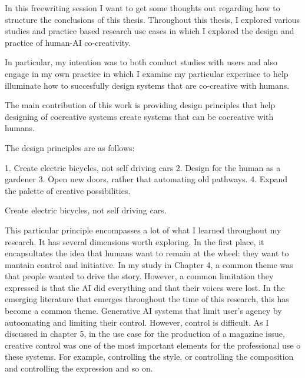 In this freewriting session I want to get some thoughts out regarding how to structure the conclusions of this thesis. Throughout this thesis, I explored various studies and practice based research use cases in which I explored the design and practice of human-AI co-creativity. 

In particular, my intention was to both conduct studies with users and also engage in my own practice in which I examine my particular experince to help illuminate how to succesfully design systems that are co-creative with humans. 

The main contribution of this work is providing design principles that help designing of cocreative systems create systems that can be cocreative with humans. 

The design principles are as follows: 

1. Create electric bicycles, not self driving cars
2. Design for the human as a gardener
3. Open new doors, rather that automating old pathways. 
4. Expand the palette of creative possibilities. 

Create electric bicycles, not self driving cars. 

This particular principle encompasses a lot of what I learned throughout my research. 
It has several dimensions worth exploring. 
In the first place, it encapsultates the idea that humans want to remain at the wheel: they want to mantain control and initiative. 
In my study in Chapter 4, a common theme was that people wanted to drive the story. 
However, a common limitation they expressed is that the AI did everything and that their voices were lost. 
In the emerging literature that emerges throughout the time of this research, this has become a common theme. 
Generative AI systems that limit user's agency by autoomating and limiting their control. 
However, control is difficult. 
As I discussed in chapter 5, in the use case for the production of a magazine issue, creative control was one of the most important elements for the professional use o these systems.
For example, controlling the style, or controlling the composition and controlling the expression and so on. 

